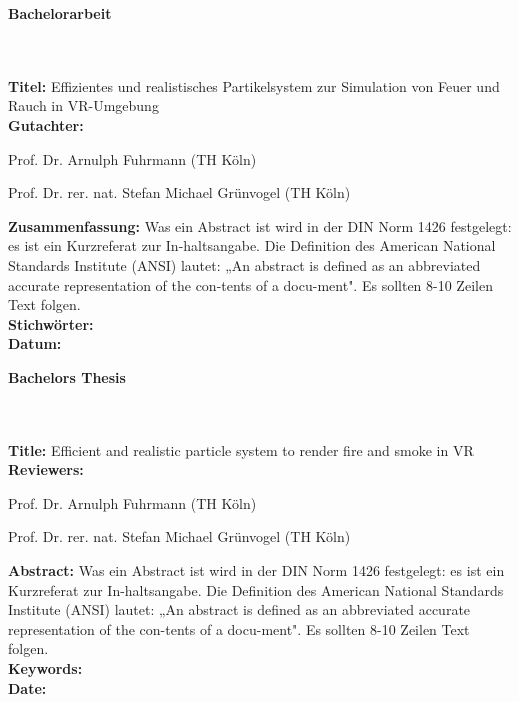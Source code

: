 \addtocounter{page}{1}

\begin{flushleft}
    \begin{huge}
        \textbf{Bachelorarbeit}
    \end{huge}
    ~\\
    ~\\
    \textbf{Titel:}  Effizientes und realistisches Partikelsystem zur Simulation von Feuer und Rauch in VR-Umgebung
    ~\\
    \doublespacing
    \textbf{Gutachter:}
    \begin{description}
        \vspace{-0.2cm}
        \itemsep-8pt
        \item[–]
            Prof. Dr. Arnulph Fuhrmann (TH Köln)
        \item[–]
            Prof. Dr. rer. nat. Stefan Michael Grünvogel (TH Köln)
    \end{description}
    \vspace{-0.5cm}
    \singlespacing
    \textbf{Zusammenfassung:} Was ein Abstract ist wird in der DIN Norm 1426 festgelegt: es ist ein Kurzreferat zur In-haltsangabe. Die Definition des American National Standards Institute (ANSI) lautet: „An abstract is defined as an abbreviated accurate representation of the con-tents of a docu-ment". Es sollten 8-10 Zeilen Text folgen.
    ~\\
    \doublespacing
    \textbf{Stichwörter:} \\
    \textbf{Datum:}

\end{flushleft}
\vspace{2cm}

\begin{flushleft}
    \begin{huge}
        \textbf{Bachelors Thesis}
    \end{huge}
    ~\\
    ~\\
    \textbf{Title:} Efficient and realistic particle system to render fire and smoke in VR
    ~\\
    \doublespacing
    \textbf{Reviewers:}
    \begin{description}
        \vspace{-0.2cm}
        \itemsep-8pt
        \item[–]
            Prof. Dr. Arnulph Fuhrmann (TH Köln)
        \item[–]
            Prof. Dr. rer. nat. Stefan Michael Grünvogel (TH Köln)
    \end{description}
    \vspace{-0.5cm}
    \singlespacing
    \textbf{Abstract:} Was ein Abstract ist wird in der DIN Norm 1426 festgelegt: es ist ein Kurzreferat zur In-haltsangabe. Die Definition des American National Standards Institute (ANSI) lautet: „An abstract is defined as an abbreviated accurate representation of the con-tents of a docu-ment". Es sollten 8-10 Zeilen Text folgen.
    ~\\
    \doublespacing
    \textbf{Keywords:} \\
    \textbf{Date:}
\end{flushleft}